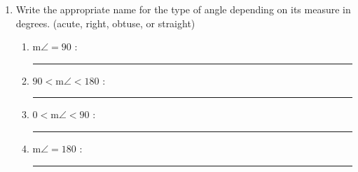 \begin{enumerate}
\item Write the appropriate name for the type of angle depending on its measure in degrees. (acute, right, obtuse, or straight) \bigskip
  \begin{enumerate}
    \item m$\angle = 90$ : \rule{4cm}{0.15mm} \bigskip
    \item $90 < \text{m}\angle < 180$ : \rule{4cm}{0.15mm} \bigskip
    \item $0< \text{m}\angle < 90$ : \rule{4cm}{0.15mm} \bigskip
    \item m$\angle = 180$ : \rule{4cm}{0.15mm} \bigskip
  \end{enumerate}


\end{enumerate}
